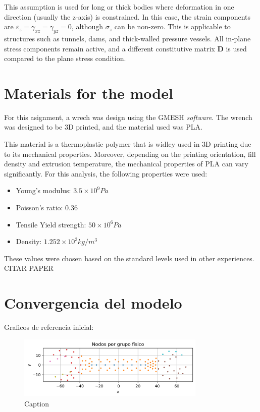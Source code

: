 \documentclass{article}  %
\begin{document}
This assumption is used for long or thick bodies where deformation in one direction (usually the z-axis) is constrained. In this case, the strain components are $\varepsilon_z = \gamma_{xz} = \gamma_{yz} = 0$, although $\sigma_z$ can be non-zero. This is applicable to structures such as tunnels, dams, and thick-walled pressure vessels. All in-plane stress components remain active, and a different constitutive matrix $\mathbf{D}$ is used compared to the plane stress condition.




\newpage

\section{Materials for the model}

For this asignment, a wrech was design using the GMESH \textit{software}. The wrench was designed to be 3D printed, and the material used was PLA. 

This material is a thermoplastic polymer that is widley used in 3D printing due to its mechanical properties. Moreover, depending on the printing orientation, fill density and extrusion temperature, the mechanical properties of PLA can vary significantly. For this analysis, the following properties were used:

\begin{itemize}
  \item Young's modulus: $3.5 \times 10^9 Pa$
  \item Poisson's ratio: 0.36
  \item Tensile Yield strength: $50 \times 10^6 Pa $
  \item Density: $1.252 \times 10^3 kg/m^3$
\end{itemize}

These values were chosen based on the standard levels used in other experiences. CITAR PAPER

\newpage

\section{Convergencia del modelo}

Graficos de referencia inicial:

\begin{figure}[H]
  \centering
  \includegraphics[width=0.8\textwidth]{GRAFICOS/Initial_nodes_por_grupo.png}
  \caption{Caption}
  \label{fig:wrench}
\end{figure}
\end{document}
